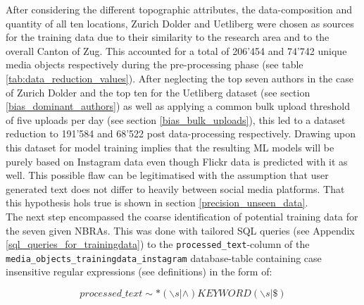 After considering the different topographic attributes, the data-composition and quantity of all ten locations, Zurich Dolder and Uetliberg were chosen as sources for the training data due to their similarity to the research area and to the overall Canton of Zug. This accounted for a total of 206'454 and 74'742 unique media objects respectively during the pre-processing phase (see table \ref{tab:data_reduction_values}). After neglecting the top seven authors in the case of Zurich Dolder and the top ten for the Uetliberg dataset (see section \ref{bias_dominant_authors}) as well as applying a common bulk upload threshold of five uploads per day (see section \ref{bias_bulk_uploads}), this led to a dataset reduction to 191'584 and 68'522 post data-processing respectively. Drawing upon this dataset for model training implies that the resulting ML models will be purely based on Instagram data even though Flickr data is predicted with it as well. This possible flaw can be legitimatised with the assumption that user generated text does not differ to heavily between social media platforms. That this hypothesis hols true is shown in section \ref{precision_unseen_data}.\\

The next step encompassed the coarse identification of potential training data for the seven given NBRAs. This was done with tailored SQL queries (see Appendix \ref{sql_queries_for_trainingdata}) to the \texttt{processed\_text}-column of the \texttt{media\_objects\_trainingdata\_instagram} database-table containing case insensitive regular expressions (see definitions) in the form of:

\[processed\_text \sim * (\backslash s | \wedge)KEYWORD(\backslash s | \$)\]

